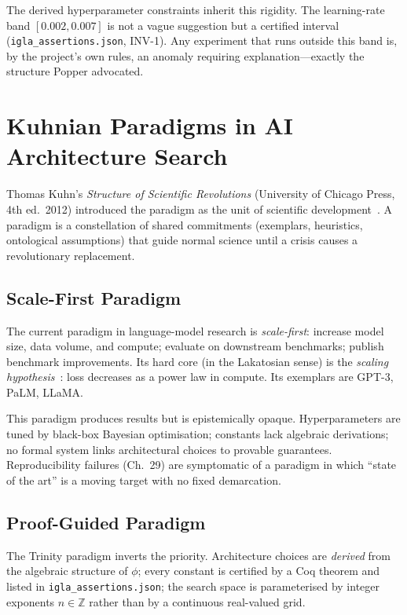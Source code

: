 The derived hyperparameter constraints inherit this rigidity.  The learning-rate
band \([0.002, 0.007]\) is not a vague suggestion but a certified interval
(\texttt{igla\_assertions.json}, INV-1).  Any experiment that runs outside this
band is, by the project's own rules, an anomaly requiring explanation—exactly
the structure Popper advocated.

\section{Kuhnian Paradigms in AI Architecture Search}
\label{sec:phd31-kuhn}

Thomas Kuhn's \emph{Structure of Scientific Revolutions} (University of Chicago
Press, 4th ed.\ 2012) introduced the paradigm as the unit of scientific
development~\cite{kuhn1962}.  A paradigm is a constellation of shared commitments
(exemplars, heuristics, ontological assumptions) that guide normal science until
a crisis causes a revolutionary replacement.

\subsection{Scale-First Paradigm}

The current paradigm in language-model research is \emph{scale-first}: increase
model size, data volume, and compute; evaluate on downstream benchmarks; publish
benchmark improvements.  Its hard core (in the Lakatosian sense) is the
\emph{scaling hypothesis}~\cite{kaplan2020scaling}: loss decreases as a power
law in compute.  Its exemplars are GPT-3, PaLM, LLaMA.

This paradigm produces results but is epistemically opaque.  Hyperparameters
are tuned by black-box Bayesian optimisation; constants lack algebraic
derivations; no formal system links architectural choices to provable
guarantees.  Reproducibility failures (Ch.\ 29) are symptomatic of a paradigm
in which ``state of the art'' is a moving target with no fixed demarcation.

\subsection{Proof-Guided Paradigm}

The Trinity paradigm inverts the priority.  Architecture choices are
\emph{derived} from the algebraic structure of \(\phi\); every constant is
certified by a Coq theorem and listed in \texttt{igla\_assertions.json};
the search space is parameterised by integer exponents \(n \in \mathbb{Z}\)
rather than by a continuous real-valued grid.

